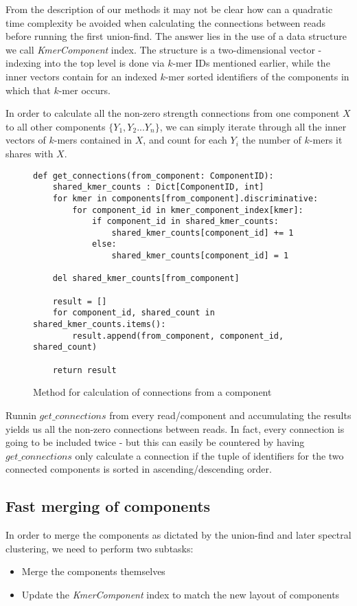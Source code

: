 From the description of our methods it may not be clear how can a quadratic time complexity be avoided when calculating the connections between reads before running the first union-find. The answer lies in the use of a data structure we call \textit{KmerComponent} index.
The structure is a two-dimensional vector - indexing into the top level is done via $k$-mer IDs mentioned earlier, while the inner vectors contain for an indexed $k$-mer sorted identifiers of the components in which that $k$-mer occurs.

In order to calculate all the non-zero strength connections from one component $X$ to all other components $\{Y_1, Y_2...Y_n\}$, we can simply iterate through all the inner vectors of $k$-mers contained in $X$, and count for each $Y_i$ the number of $k$-mers it shares with $X$.

\begin{figure}[H]
\lstset{language=Python}
\begin{lstlisting}[basicstyle=\small]
def get_connections(from_component: ComponentID):
    shared_kmer_counts : Dict[ComponentID, int]
    for kmer in components[from_component].discriminative:
        for component_id in kmer_component_index[kmer]:
            if component_id in shared_kmer_counts:
                shared_kmer_counts[component_id] += 1
            else:
                shared_kmer_counts[component_id] = 1

    del shared_kmer_counts[from_component]

    result = []
    for component_id, shared_count in shared_kmer_counts.items():
        result.append(from_component, component_id, shared_count)

    return result

\end{lstlisting}
\caption{Method for calculation of connections from a component}
\label{fig:get_connections}
\end{figure}

Runnin $get\_connections$ from every read/component and accumulating the results yields us all the non-zero connections between reads. In fact, every connection is going to be included twice - but this can easily be countered by having $get\_connections$ only calculate a connection if the tuple of identifiers for the two connected components is sorted in ascending/descending order.

\subsection{Fast merging of components}
In order to merge the components as dictated by the union-find and later spectral clustering, we need to perform two subtasks:
\begin{itemize}
\item Merge the components themselves
\item Update the \textit{KmerComponent} index to match the new layout of components
\end{itemize}

